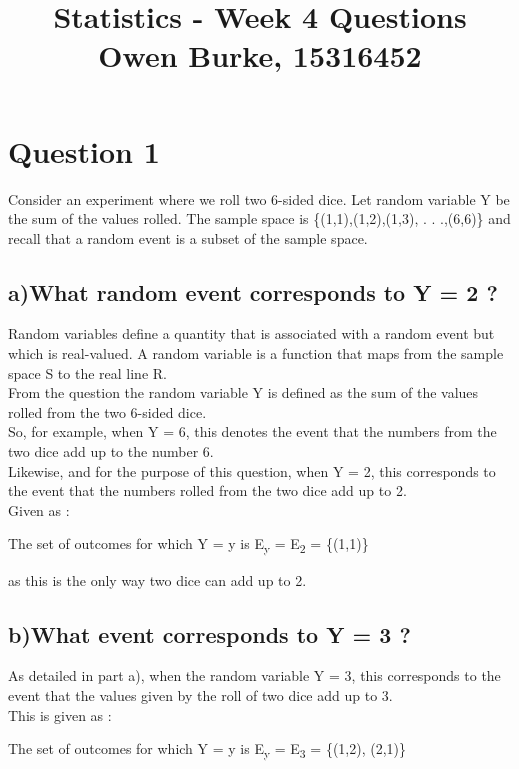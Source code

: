 \documentclass{report}
\title{\textbf{Statistics - Week 4 Questions}\\Owen Burke, 15316452}
\begin{document}
	\maketitle
	\section*{\hfil Question 1 \hfil}
    Consider an experiment where we roll two 6-sided dice. Let random variable Y be the sum of the values rolled. The sample space is \{(1,1),(1,2),(1,3), . . .,(6,6)\} and recall that a 
    random event is a subset of the sample space.
		\subsection*{a)What random event corresponds to Y = 2 ?}
		
        Random variables define a quantity that is associated with a random event but which is real-valued. A random variable is a function that maps from the sample space S 
        to the real line R.\\
        From the question the random variable Y is defined as the sum of the values rolled from the two 6-sided dice.\\
        So, for example, when Y = 6, this denotes the event that the numbers from the two dice add up to the number 6.\\
        Likewise, and for the purpose of this question, when Y = 2, this corresponds to the event that the numbers rolled from the two dice add up to 2.\\
        Given as :
        
		\begin{center}
            The set of outcomes for which Y = y is E\textsubscript{y} = E\textsubscript{2} = \{(1,1)\}
        \end{center}

        as this is the only way two dice can add up to 2.

	
		\subsection*{b)What event corresponds to Y = 3 ?}

        As detailed in part a), when the random variable Y = 3, this corresponds to the event that the values given by the roll of two dice add up to 3.\\
        This is given as :

        \begin{center}
            The set of outcomes for which Y = y is E\textsubscript{y} = E\textsubscript{3} = \{(1,2), (2,1)\}
        \end{center}
\end{document}
